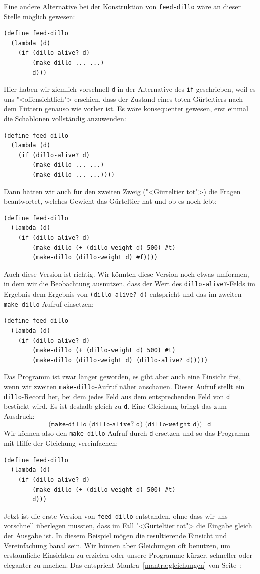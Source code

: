 Eine andere Alternative bei der Konstruktion von \texttt{feed-dillo}
wäre an dieser Stelle möglich gewesen:
%
\begin{verbatim}
(define feed-dillo
  (lambda (d)
    (if (dillo-alive? d)
        (make-dillo ... ...)
        d)))
\end{verbatim}
%
Hier haben wir ziemlich vorschnell \texttt{d} in der Alternative des
\texttt{if} geschrieben, weil es uns "<offensichtlich"> erschien, dass
der Zustand eines toten Gürteltiers nach dem Füttern genauso wie
vorher ist.  Es wäre konsequenter gewesen, erst einmal die Schablonen
vollständig anzuwenden:
%
\begin{verbatim}
(define feed-dillo
  (lambda (d)
    (if (dillo-alive? d)
        (make-dillo ... ...)
        (make-dillo ... ...))))
\end{verbatim}
%
Dann hätten wir auch für den zweiten Zweig ("<Gürteltier tot">) die Fragen beantwortet,
welches Gewicht das Gürteltier hat und ob es noch lebt:
%
\begin{verbatim}
(define feed-dillo
  (lambda (d)
    (if (dillo-alive? d)
        (make-dillo (+ (dillo-weight d) 500) #t)
        (make-dillo (dillo-weight d) #f))))
\end{verbatim}
%
Auch diese Version ist richtig.  Wir könnten diese Version noch etwas
umformen, in dem wir die Beobachtung ausnutzen, dass der Wert des
\texttt{dillo-alive?}-Felds im Ergebnis dem Ergebnis von
\texttt{(dillo-alive? d)} entspricht und das im zweiten
\texttt{make-dillo}-Aufruf einsetzen:
%
\begin{verbatim}
(define feed-dillo
  (lambda (d)
    (if (dillo-alive? d)
        (make-dillo (+ (dillo-weight d) 500) #t)
        (make-dillo (dillo-weight d) (dillo-alive? d)))))
\end{verbatim}
%
Das Programm ist zwar länger geworden, es gibt aber auch eine Einsicht
frei, wenn wir zweiten \texttt{make-dillo}-Aufruf näher anschauen.
Dieser Aufruf stellt ein \texttt{dillo}-Record her, bei dem jedes Feld
aus dem entsprechenden Feld von \texttt{d} bestückt wird.  Es ist
deshalb gleich zu \texttt{d}.  Eine Gleichung bringt das zum Ausdruck:
%
\begin{displaymath}
  \texttt{(make-dillo (dillo-alive? d) (dillo-weight d))} = \texttt{d}
\end{displaymath}
%
Wir können also den \texttt{make-dillo}-Aufruf durch \texttt{d}
ersetzen und so das Programm mit Hilfe der Gleichung vereinfachen:
%
\begin{verbatim}
(define feed-dillo
  (lambda (d)
    (if (dillo-alive? d)
        (make-dillo (+ (dillo-weight d) 500) #t)
        d)))
\end{verbatim}
%
Jetzt ist die erste Version von \texttt{feed-dillo} entstanden, ohne
dass wir uns vorschnell überlegen mussten, dass im Fall "<Gürteltier
tot"> die Eingabe gleich der Ausgabe ist.  In diesem Beispiel mögen die
resultierende Einsicht und Vereinfachung banal sein.  Wir können aber
Gleichungen oft benutzen, um erstaunliche Einsichten zu erzielen oder
unsere Programme kürzer, schneller oder eleganter zu machen.  Das
entspricht Mantra~\ref{mantra:gleichungen} von
Seite~\pageref{mantra:gleichungen}:
%
\mantragleichungen%

